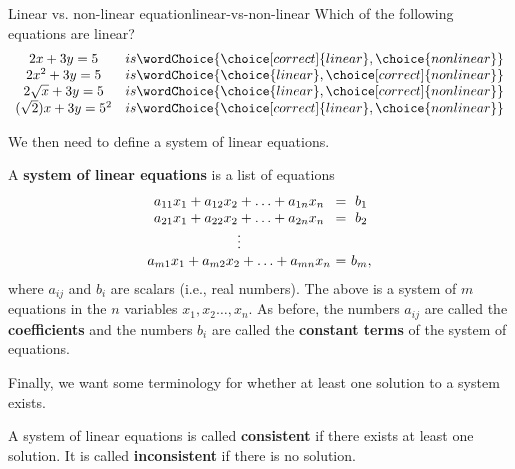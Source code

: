 \documentclass{ximera}
\begin{document}
\begin{exploration}
\begin{example}
\begin{remark}
    \begin{example}{Linear vs. non-linear equation}{linear-vs-non-linear}
      Which of the following equations are linear?
      \begin{equation*}
        \begin{array}{cc}
          2x+3y=5 & is \wordChoice{\choice[correct]{linear},\choice{non linear}}\\
          2x^2+3y=5 & is \wordChoice{\choice{linear},\choice[correct]{non linear}}\\
          2\sqrt{x} + 3y = 5 & is \wordChoice{\choice{linear},\choice[correct]{non linear}}\\
          (\sqrt{2}) x + 3y = 5^2 & is \wordChoice{\choice[correct]{linear},\choice{non linear}}
        \end{array}
      \end{equation*}
    \end{example}

    We then need to define a system of linear equations.

    \begin{definition}
      A \textbf{system of linear equations}%
       is a list of equations
      \begin{equation*}
        \begin{array}{c@{~}c@{~}c}
          a_{11}x_1+a_{12}x_2+\ldots+a_{1n}x_n&=&b_1 \\
          a_{21}x_1+a_{22}x_2+\ldots+a_{2n}x_n&=&b_2 \\
          \vdots \\
          a_{m1}x_1+a_{m2}x_2+\ldots+a_{mn}x_n&=&b_m,
        \end{array}
      \end{equation*}
      where $a_{ij}$ and $b_i$ are scalars (i.e., real numbers). The above
      is a system of $m$ equations in the $n$ variables
      $x_1,x_2\ldots,x_n$.  As before, the numbers $a_{ij}$ are called the
      \textbf{coefficients}%
       and the numbers $b_i$ are called the
      \textbf{constant terms}%
       of the system of equations.
    \end{definition}

    Finally, we want some terminology for whether at least one solution to a system exists.

    \begin{definition}
      A system of linear equations is called \textbf{consistent}%
       if there exists at
      least one solution. It is called \textbf{inconsistent}%
       if there is no
      solution.
    \end{definition}


\end{remark}
\end{example}
\end{exploration}
\end{document}
